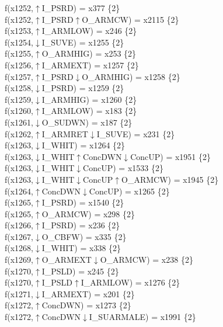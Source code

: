 f(x1252,$\uparrow$I\_PSRD) = x377 \{2\} \\  
f(x1252,$\uparrow$I\_PSRD$\uparrow$O\_ARMCW) = x2115 \{2\} \\  
f(x1253,$\uparrow$I\_ARMLOW) = x246 \{2\} \\  
f(x1254,$\downarrow$I\_SUVE) = x1255 \{2\} \\  
f(x1255,$\uparrow$O\_ARMHIG) = x253 \{2\} \\  
f(x1256,$\uparrow$I\_ARMEXT) = x1257 \{2\} \\  
f(x1257,$\uparrow$I\_PSRD$\downarrow$O\_ARMHIG) = x1258 \{2\} \\  
f(x1258,$\downarrow$I\_PSRD) = x1259 \{2\} \\  
f(x1259,$\downarrow$I\_ARMHIG) = x1260 \{2\} \\  
f(x1260,$\uparrow$I\_ARMLOW) = x183 \{2\} \\  
f(x1261,$\downarrow$O\_SUDWN) = x187 \{2\} \\  
f(x1262,$\uparrow$I\_ARMRET$\downarrow$I\_SUVE) = x231 \{2\} \\  
f(x1263,$\downarrow$I\_WHIT) = x1264 \{2\} \\  
f(x1263,$\downarrow$I\_WHIT$\uparrow$ConcDWN$\downarrow$ConcUP) = x1951 \{2\} \\  
f(x1263,$\downarrow$I\_WHIT$\downarrow$ConcUP) = x1533 \{2\} \\  
f(x1263,$\downarrow$I\_WHIT$\downarrow$ConcUP$\uparrow$O\_ARMCW) = x1945 \{2\} \\  
f(x1264,$\uparrow$ConcDWN$\downarrow$ConcUP) = x1265 \{2\} \\  
f(x1265,$\uparrow$I\_PSRD) = x1540 \{2\} \\  
f(x1265,$\uparrow$O\_ARMCW) = x298 \{2\} \\  
f(x1266,$\uparrow$I\_PSRD) = x236 \{2\} \\  
f(x1267,$\downarrow$O\_CBFW) = x335 \{2\} \\  
f(x1268,$\downarrow$I\_WHIT) = x338 \{2\} \\  
f(x1269,$\uparrow$O\_ARMEXT$\downarrow$O\_ARMCW) = x238 \{2\} \\  
f(x1270,$\uparrow$I\_PSLD) = x245 \{2\} \\  
f(x1270,$\uparrow$I\_PSLD$\uparrow$I\_ARMLOW) = x1276 \{2\} \\  
f(x1271,$\downarrow$I\_ARMEXT) = x201 \{2\} \\  
f(x1272,$\uparrow$ConcDWN) = x1273 \{2\} \\  
f(x1272,$\uparrow$ConcDWN$\downarrow$I\_SUARMALE) = x1991 \{2\} \\  
